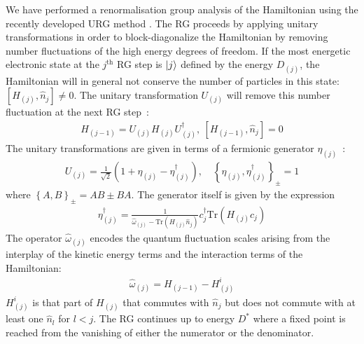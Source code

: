 \documentclass[reprint,prb,superscriptaddress]{revtex4-2}
\begin{document}
We have performed a renormalisation group analysis of the Hamiltonian using the recently developed URG method \cite{anirbanmott1,anirbanmott2,anirbanurg1,anirbanurg2,siddharthacpi,santanukagome,1dhubjhep}.
The RG proceeds {by applying unitary transformations in order to block-diagonalize the Hamiltonian by removing number fluctuations of the high energy degrees of freedom}.
If the most energetic electronic state at the \(j^\text{th}\) RG step is \(\ket{j}\) defined by the energy \(D_{(j)}\), the Hamiltonian will in general not conserve the number of particles in this state: \(\left[H_{(j)}, \hat n_{j}\right] \neq 0\).
The unitary transformation \(U_{(j)}\) will remove this number fluctuation at the next RG step~\cite{anirbanurg1,anirbanurg2}:
\begin{equation}\begin{aligned}
	H_{(j-1)} = U_{(j)} H_{(j)} U^\dagger_{(j)}, ~\left[H_{(j-1)}, \hat n_{j}\right] =0
\end{aligned}\end{equation}
The unitary transformations are given in terms of a fermionic generator \(\eta_{(j)}\)~\cite{anirbanurg1,anirbanurg2}:
\begin{equation}\begin{aligned}
	U_{(j)} = \frac{1}{\sqrt 2}\left(1 + \eta_{(j)} - \eta_{(j)}^\dagger\right), \quad\left\{ \eta_{(j)},\eta_{(j)}^\dagger \right\}_\pm = 1
\end{aligned}\end{equation}
where \(\left\{A,B\right\}_\pm = AB \pm BA\). The generator itself is given by the expression~\cite{anirbanurg1,anirbanurg2}
\begin{equation}\begin{aligned}
	\eta^\dagger_{(j)} = \frac{1}{\hat \omega_{(j)} - \text{Tr}\left(H_{(j)} \hat n_{j}\right) } c^\dagger_{j} \text{Tr}\left(H_{(j)}c_{j}\right)
\end{aligned}\end{equation}
The operator \(\hat \omega_{(j)}\) encodes the quantum fluctuation scales arising from the interplay of the kinetic energy terms and the interaction terms of the Hamiltonian:
\begin{equation}\begin{aligned}
	\hat \omega_{(j)} = H_{(j-1)} - H^i_{(j)}
\end{aligned}\end{equation}
\(H^i_{(j)}\) is that part of \(H_{(j)}\) that commutes with \(\hat n_j\) but does not commute with at least one \(\hat n_l\) for \(l < j\). The RG continues up to energy \(D^*\) where a fixed point is reached from the vanishing of either the numerator or the denominator.
\end{document}
